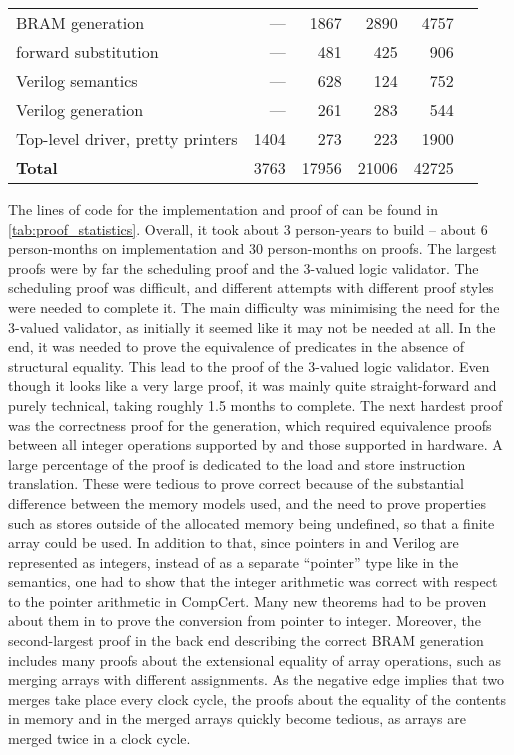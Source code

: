 \begin{table}
\begin{tabular}{lrrrrr}
    {BRAM generation}                     &  --- & 1867 & 2890 &  4757 \\
    {forward substitution}                &  --- &  481 &  425 &  906 \\
    {Verilog semantics}                   &  --- &  628 &  124 &  752 \\
    {Verilog generation}                  &  --- &  261 &  283 &  544 \\
    {Top-level driver, pretty printers}   & 1404 &  273 &  223 & 1900 \\
    \midrule
    \textbf{Total}                        & 3763 & 17956 & 21006 & 42725 \\
    \bottomrule
  \end{tabular}
\end{table}

The lines of code for the implementation and proof of \vericert{} can be found
in \cref{tab:proof_statistics}.  Overall, it took about 3 person-years to build
\vericert{} -- about 6 person-months on implementation and 30 person-months on
proofs.  The largest proofs were by far the scheduling proof and the 3-valued
logic validator.  The scheduling proof was difficult, and different attempts
with different proof styles were needed to complete it.  The main difficulty was
minimising the need for the 3-valued validator, as initially it seemed like it
may not be needed at all.  In the end, it was needed to prove the equivalence of
predicates in the absence of structural equality.  This lead to the proof of the
3-valued logic validator.  Even though it looks like a very large proof, it was
mainly quite straight-forward and purely technical, taking roughly 1.5 months to
complete.  The next hardest proof was the correctness proof for the \htl{}
generation, which required equivalence proofs between all integer operations
supported by \compcert{} and those supported in hardware.  A large percentage of
the proof is dedicated to the load and store instruction translation.  These
were tedious to prove correct because of the substantial difference between the
memory models used, and the need to prove properties such as stores outside of
the allocated memory being undefined, so that a finite array could be used. In
addition to that, since pointers in \htl{} and Verilog are represented as
integers, instead of as a separate \enquote{pointer} type like in the
\compcert{} semantics, one had to show that the integer arithmetic was correct
with respect to the pointer arithmetic in CompCert.  Many new theorems had to be
proven about them in \vericert{} to prove the conversion from pointer to
integer.  Moreover, the second-largest proof in the back end describing the
correct \gls{BRAM} generation includes many proofs about the extensional
equality of array operations, such as merging arrays with different assignments.
As the negative edge implies that two merges take place every clock cycle, the
proofs about the equality of the contents in memory and in the merged arrays
quickly become tedious, as arrays are merged twice in a clock cycle.

